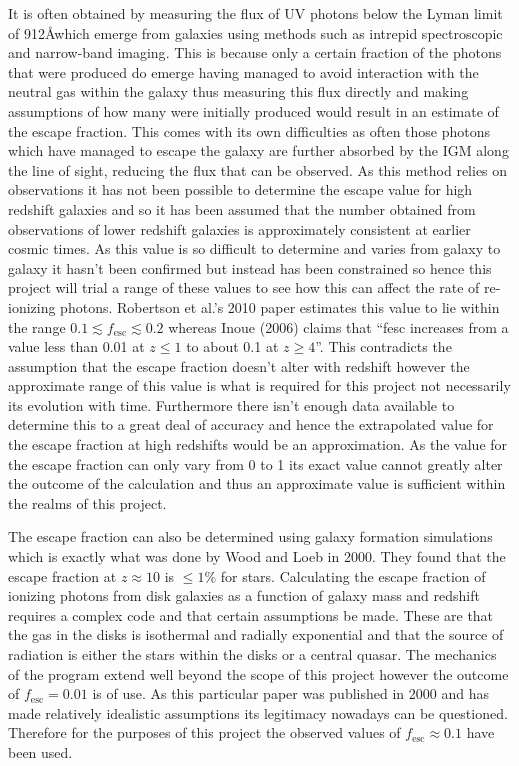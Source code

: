 		It is often obtained by measuring the flux of UV photons below the Lyman limit of 912\AA which emerge from galaxies using methods such as intrepid spectroscopic and narrow-band imaging\cite{robertson2010early}. This is because only a certain fraction of the photons that were produced do emerge having managed to avoid interaction with the neutral gas within the galaxy thus measuring this flux directly and making assumptions of how many were initially produced would result in an estimate of the escape fraction. This comes with its own difficulties as often those photons which have managed to escape the galaxy are further absorbed by the IGM along the line of sight, reducing the flux that can be observed. As this method relies on observations it has not been possible to determine the escape value for high redshift galaxies and so it has been assumed that the number obtained from observations of lower redshift galaxies is approximately consistent at earlier cosmic times. As this value is so difficult to determine and varies from galaxy to galaxy it hasn’t been confirmed but instead has been constrained so hence this project will trial a range of these values to see how this can affect the rate of re-ionizing photons. Robertson et al.’s 2010 paper estimates this value to lie within the range $0.1\lesssim f_\text{esc}\lesssim 0.2$\cite{robertson2010early} whereas Inoue (2006) claims that ``fesc increases from a value less than 0.01 at $z\le1$ to about 0.1 at $z\ge 4$''\cite{inoue2006escape}. This contradicts the assumption that the escape fraction doesn’t alter with redshift however the approximate range of this value is what is required for this project not necessarily its evolution with time. Furthermore there isn’t enough data available to determine this to a great deal of accuracy and hence the extrapolated value for the escape fraction at high redshifts would be an approximation. As the value for the escape fraction can only vary from 0 to 1 its exact value cannot greatly alter the outcome of the calculation and thus an approximate value is sufficient within the realms of this project.

		The escape fraction can also be determined using galaxy formation simulations which is exactly what was done by Wood and Loeb in 2000. They found that the escape fraction at $z\approx 10$ is $\le1$\% for stars\cite{gnedin2008escape}. Calculating the escape fraction of ionizing photons from disk galaxies as a function of galaxy mass and redshift requires a complex code and that certain assumptions be made. These are that the gas in the disks is isothermal and radially exponential and that the source of radiation is either the stars within the disks or a central quasar. The mechanics of the program extend well beyond the scope of this project however the outcome of $f_\text{esc}=0.01$ is of use. As this particular paper was published in 2000 and has made relatively idealistic assumptions its legitimacy nowadays can be questioned. Therefore for the purposes of this project the observed values of $f_\text{esc}\approx 0.1$ have been used.

